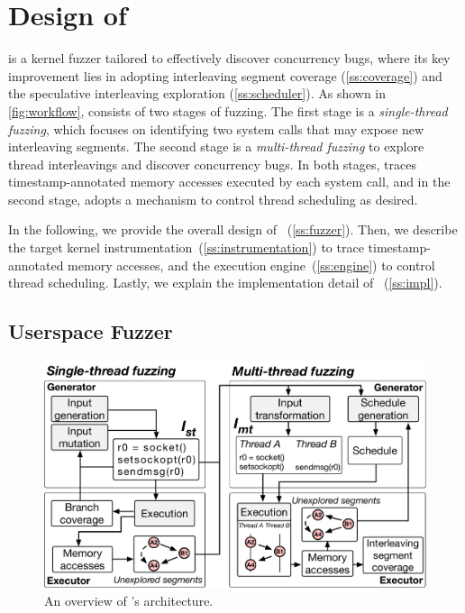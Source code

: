 \section{Design of \sys}
\label{s:impl}

\sys is a kernel fuzzer tailored to effectively discover concurrency
bugs, where its key improvement lies in adopting interleaving segment
coverage (\autoref{ss:coverage}) and the speculative interleaving
exploration (\autoref{ss:scheduler}).
%
As shown in \autoref{fig:workflow}, \sys consists of two stages of
fuzzing.
%
The first stage is a \textit{single-thread fuzzing}, which focuses on
identifying two system calls that may expose new interleaving
segments.
%
The second stage is a \textit{multi-thread fuzzing} to explore thread
interleavings and discover concurrency bugs.
%
In both stages, \sys traces timestamp-annotated memory accesses
executed by each system call, and in the second stage, \sys adopts a
mechanism to control thread scheduling as desired.



In the following, we provide the overall design of
\sys~(\autoref{ss:fuzzer}).
%
Then, we describe the target kernel
instrumentation~(\autoref{ss:instrumentation}) to trace
timestamp-annotated memory accesses, and the execution
engine~(\autoref{ss:engine}) to control thread scheduling.
%
Lastly, we explain the implementation detail of
\sys~(\autoref{ss:impl}).




\subsection{Userspace Fuzzer}
\label{ss:fuzzer}

\begin{figure}
  \centering
  \includegraphics[width=\linewidth]{fig/architecture.pdf}
  \caption{An overview of \sys's architecture.}
  \label{fig:workflow}
\end{figure}


